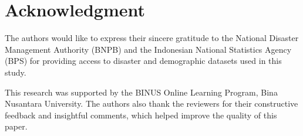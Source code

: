\documentclass[journal,final,a4paper,twoside,11pt]{IEEEtran}
\begin{document}
\section*{Acknowledgment}

The authors would like to express their sincere gratitude to the National Disaster Management Authority (BNPB) and the Indonesian National Statistics Agency (BPS) for providing access to disaster and demographic datasets used in this study. 

This research was supported by the BINUS Online Learning Program, Bina Nusantara University. The authors also thank the reviewers for their constructive feedback and insightful comments, which helped improve the quality of this paper.





 




\label{lastPage}
\end{document}
